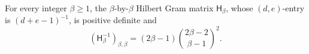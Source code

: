 For every integer \(\beta\ge1\), the \(\beta\)-by-\(\beta\) Hilbert Gram matrix \(\mathsf H_\beta\), whose \((d,e)\)-entry is \((d+e-1)^{-1}\), is positive definite and
\[
(\mathsf H_\beta^{-1})_{\beta,\beta}
=(2\beta-1)\binom{2\beta-2}{\beta-1}^{\!2}.
\]